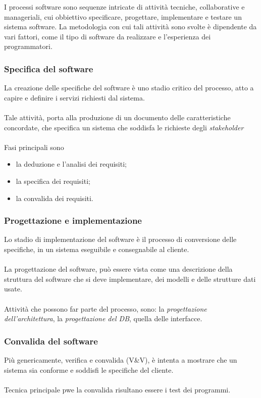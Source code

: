 \documentclass{subfiles}
\begin{document}
I processi software sono sequenze intricate di attività tecniche, collaborative e manageriali, cui obbiettivo specificare, progettare,
implementare e testare un sistema software.
La metodologia con cui tali attività sono svolte è dipendente da vari fattori, come il tipo di software da realizzare e l'esperienza dei programmatori.

\subsubsection{Specifica del software}
La creazione delle specifiche del software è uno stadio critico del processo, atto a capire e definire i servizi richiesti dal sistema.
\\ \\
Tale attività, porta alla produzione di un documento delle caratteristiche concordate, che specifica un sistema che soddisfa le richieste degli \emph{stakeholder\footnotemark[1]}
\\ \\
Fasi principali sono
\begin{itemize}
    \item la deduzione e l'analisi dei requisiti;
    \item la specifica dei requisiti;
    \item la convalida dei requisiti.
\end{itemize}



\subsubsection{Progettazione e implementazione}
Lo stadio di implementazione del software è il processo di conversione delle specifiche, in un sistema eseguibile e consegnabile al cliente.
\\ \\
La progettazione del software, può essere vista come una descrizione della struttura del software che si deve implementare, dei modelli e delle strutture dati usate.
\\ \\
Attività che possono far parte del processo, sono: la \emph{progettazione dell'architettura}, la \emph{progettazione del DB}, quella delle interfacce.

\subsubsection{Convalida del software}
Più genericamente, verifica e convalida (V\&V), è intenta a mostrare che un sistema sia conforme e soddisfi le specifiche del cliente.
\\ \\
Tecnica principale pwe la convalida risultano essere i test dei programmi.
\end{document}
